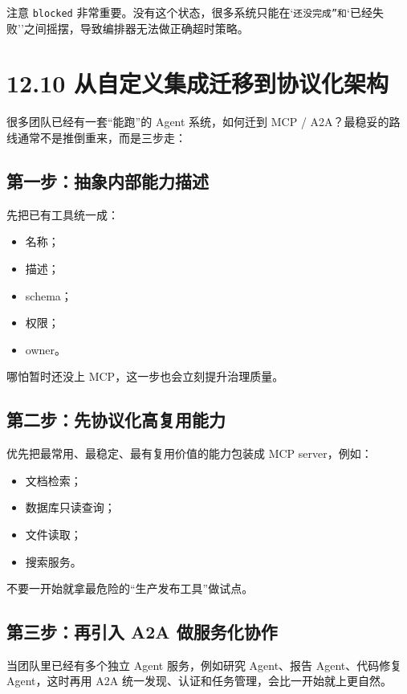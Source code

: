 注意 \texttt{blocked} 非常重要。没有这个状态，很多系统只能在`\texttt{还没完成''和}`已经失败''之间摇摆，导致编排器无法做正确超时策略。


\section{12.10 从自定义集成迁移到协议化架构}

很多团队已经有一套``能跑''的 Agent 系统，如何迁到 MCP / A2A？最稳妥的路线通常不是推倒重来，而是三步走：


\subsection{第一步：抽象内部能力描述}

先把已有工具统一成：


\begin{itemize}[leftmargin=2em]
\item 名称；
\item 描述；
\item schema；
\item 权限；
\item owner。
\end{itemize}

哪怕暂时还没上 MCP，这一步也会立刻提升治理质量。


\subsection{第二步：先协议化高复用能力}

优先把最常用、最稳定、最有复用价值的能力包装成 MCP server，例如：


\begin{itemize}[leftmargin=2em]
\item 文档检索；
\item 数据库只读查询；
\item 文件读取；
\item 搜索服务。
\end{itemize}

不要一开始就拿最危险的``生产发布工具''做试点。


\subsection{第三步：再引入 A2A 做服务化协作}

当团队里已经有多个独立 Agent 服务，例如研究 Agent、报告 Agent、代码修复 Agent，这时再用 A2A 统一发现、认证和任务管理，会比一开始就上更自然。


